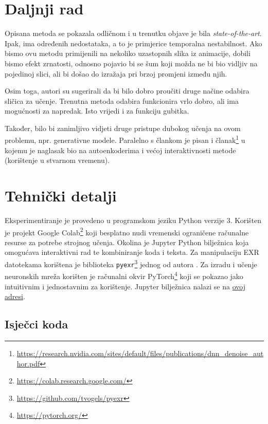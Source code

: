 \documentclass[times, utf8, seminar, numeric]{fer}
\begin{document}
\chapter{Daljnji rad}
Opisana metoda se pokazala odličnom i u trenutku objave je bila \textit{state-of-the-art}.
Ipak, ima određenih nedostataka, a to je primjerice temporalna nestabilnost. Ako bismo ovu
metodu primijenili na nekoliko uzastopnih slika iz animacije, dobili bismo efekt zrnatosti,
odnosno pojavio bi se šum koji možda ne bi bio vidljiv na pojedinoj slici, ali bi došao do
izražaja pri brzoj promjeni između njih.

Osim toga, autori su sugerirali da bi bilo dobro proučiti druge načine odabira sličica za učenje.
Trenutna metoda odabira funkcionira vrlo dobro, ali ima mogućnosti za napredak. Isto vrijedi i za
funkciju gubitka.

Također, bilo bi zanimljivo vidjeti druge pristupe dubokog učenja na ovom problemu,
npr. generativne modele. Paralelno s člankom \cite{Bako2017KPCN} je pisan i
članak\footnote{\url{https://research.nvidia.com/sites/default/files/publications/dnn_denoise_author.pdf}}
u kojemu je naglasak bio na autoenkoderima i većoj interaktivnosti metode (korištenje u
stvarnom vremenu).

\chapter{Tehnički detalji}
Eksperimentiranje je provedeno u programskom jeziku Python verzije 3. Korišten je projekt
Google Colab\footnote{\url{https://colab.research.google.com/}} koji
besplatno nudi vremenski ograničene računalne resurse za potrebe strojnog učenja.
Okolina je Jupyter Python bilježnica koja omogućava interaktivni rad te kombiniranje koda i
teksta. Za manipulaciju EXR datotekama korištena je biblioteka
\texttt{pyexr}\footnote{\url{https://github.com/tvogels/pyexr}} jednog od autora
\cite{Bako2017KPCN}.
Za izradu i učenje neuronskih mreža korišten je računalni okvir
PyTorch\footnote{\url{https://pytorch.org/}} koji se pokazao jako intuitivnim i jednostavnim za
korištenje.
Jupyter bilježnica nalazi se na \href{https://colab.research.google.com/drive/1mz8tbvjPIUbScKTQMPtY7ViRbKOtbg0y}{ovoj adresi}.

\section{Isječci koda}
\end{document}

